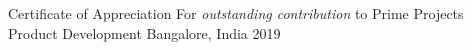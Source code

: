 \begin{cvhonors}
  \cvhonor
    {Certificate of Appreciation}
    {For \textit{outstanding contribution} to Prime Projects Product Development}
    {Bangalore, India}
    {2019}
\end{cvhonors}